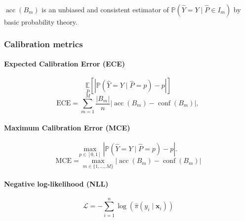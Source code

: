 $\operatorname{acc}\left(B_{m}\right)$ is an unbiased and consistent estimator of $\mathbb{P}\left(\hat{Y}=Y \mid \hat{P} \in I_{m}\right)$ by basic probability theory.

\subsubsection{Calibration metrics}
\paragraph{Expected Calibration Error (ECE)}
\begin{equation}
  \underset{\hat{P}}{\mathbb{E}}[|\mathbb{P}(\hat{Y}=Y \mid \hat{P}=p)-p|]
\end{equation}
\begin{equation}
  \mathrm{ECE}=\sum_{m=1}^{M} \frac{\left|B_{m}\right|}{n}\left|\operatorname{acc}\left(B_{m}\right)-\operatorname{conf}\left(B_{m}\right)\right| \text {, }
\end{equation}
\paragraph{Maximum Calibration Error (MCE)}
\begin{equation}
  \max _{p \in[0,1]}|\mathbb{P}(\hat{Y}=Y \mid \hat{P}=p)-p| \text {. }
\end{equation}
\begin{equation}
  \mathrm{MCE}=\max _{m \in\{1, \ldots, M\}}\left|\operatorname{acc}\left(B_{m}\right)-\operatorname{conf}\left(B_{m}\right)\right|
\end{equation}
\paragraph{Negative log-likelihood (NLL)}
\begin{equation}
  \mathcal{L}=-\sum_{i=1}^{n} \log \left(\hat{\pi}\left(y_{i} \mid \mathbf{x}_{i}\right)\right)
\end{equation}

